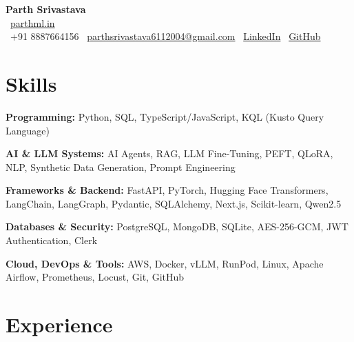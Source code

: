 \documentclass[a4paper,10pt]{article}
\begin{document}
\begin{center}
    {\LARGE \textbf{Parth Srivastava}}\\[5pt]
    \faGlobe\ \href{https://parthml.in/}{parthml.in}\\[5pt]
    \faPhone\ +91 8887664156 \quad
    \faEnvelope\ \href{mailto:parthsrivastava6112004@gmail.com}{parthsrivastava6112004@gmail.com} \quad
    \faLinkedin\ \href{https://www.linkedin.com/in/parth-srivastava-dsuser/}{LinkedIn} \quad
    \faGithub\ \href{https://github.com/Parth-Srivastava-bithub}{GitHub}
\end{center}

\section*{Skills}

\small

\textbf{Programming:} Python, SQL, TypeScript/JavaScript, KQL (Kusto Query Language)

\textbf{AI \& LLM Systems:} AI Agents, RAG, LLM Fine-Tuning, PEFT, QLoRA, NLP, Synthetic Data Generation, Prompt Engineering

\textbf{Frameworks \& Backend:} FastAPI, PyTorch, Hugging Face Transformers, LangChain, LangGraph, Pydantic, SQLAlchemy, Next.js, Scikit-learn, Qwen2.5

\textbf{Databases \& Security:} PostgreSQL, MongoDB, SQLite, AES-256-GCM, JWT Authentication, Clerk

\textbf{Cloud, DevOps \& Tools:} AWS, Docker, vLLM, RunPod, Linux, Apache Airflow, Prometheus, Locust, Git, GitHub


\normalsize

\section*{Experience}
\end{document}
